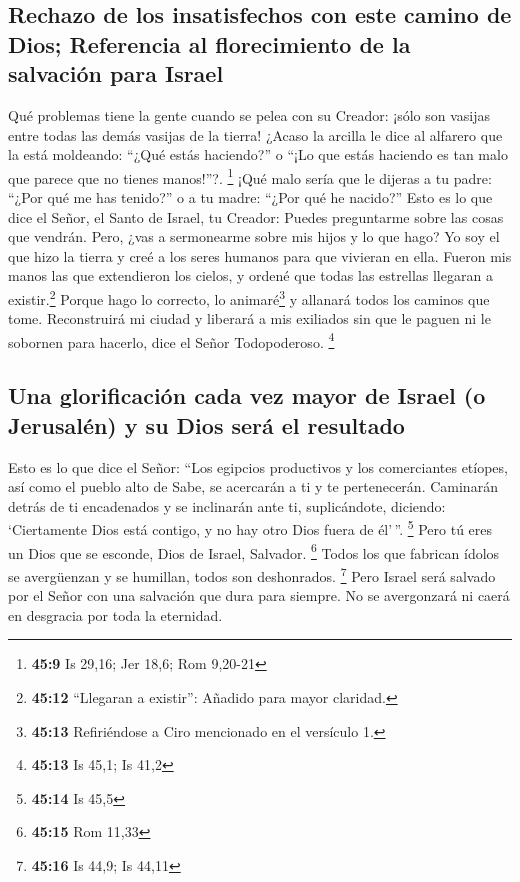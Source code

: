 \hypertarget{rechazo-de-los-insatisfechos-con-este-camino-de-dios-referencia-al-florecimiento-de-la-salvaciuxf3n-para-israel}{%
\subsection{Rechazo de los insatisfechos con este camino de Dios;
Referencia al florecimiento de la salvación para
Israel}\label{rechazo-de-los-insatisfechos-con-este-camino-de-dios-referencia-al-florecimiento-de-la-salvaciuxf3n-para-israel}}

 Qué problemas tiene la gente cuando se pelea con su
Creador: ¡sólo son vasijas entre todas las demás vasijas de la tierra!
¿Acaso la arcilla le dice al alfarero que la está moldeando: ``¿Qué
estás haciendo?'' o ``¡Lo que estás haciendo es tan malo que parece que
no tienes manos!''?. \footnote{\textbf{45:9} Is 29,16; Jer 18,6; Rom
  9,20-21}  ¡Qué malo sería que le dijeras a tu padre:
``¿Por qué me has tenido?'' o a tu madre: ``¿Por qué he nacido?''
 Esto es lo que dice el Señor, el Santo de Israel, tu
Creador: Puedes preguntarme sobre las cosas que vendrán. Pero, ¿vas a
sermonearme sobre mis hijos y lo que hago?  Yo soy el que
hizo la tierra y creé a los seres humanos para que vivieran en ella.
Fueron mis manos las que extendieron los cielos, y ordené que todas las
estrellas llegaran a existir.\footnote{\textbf{45:12} ``Llegaran a
  existir'': Añadido para mayor claridad.}  Porque hago
lo correcto, lo animaré\footnote{\textbf{45:13} Refiriéndose a Ciro
  mencionado en el versículo 1.} y allanará todos los caminos que tome.
Reconstruirá mi ciudad y liberará a mis exiliados sin que le paguen ni
le sobornen para hacerlo, dice el Señor Todopoderoso. \footnote{\textbf{45:13}
  Is 45,1; Is 41,2}

\hypertarget{una-glorificaciuxf3n-cada-vez-mayor-de-israel-o-jerusaluxe9n-y-su-dios-seruxe1-el-resultado}{%
\subsection{Una glorificación cada vez mayor de Israel (o Jerusalén) y
su Dios será el
resultado}\label{una-glorificaciuxf3n-cada-vez-mayor-de-israel-o-jerusaluxe9n-y-su-dios-seruxe1-el-resultado}}

 Esto es lo que dice el Señor: ``Los egipcios productivos
y los comerciantes etíopes, así como el pueblo alto de Sabe, se
acercarán a ti y te pertenecerán. Caminarán detrás de ti encadenados y
se inclinarán ante ti, suplicándote, diciendo: `Ciertamente Dios está
contigo, y no hay otro Dios fuera de él'\,''. \footnote{\textbf{45:14}
  Is 45,5}  Pero tú eres un Dios que se esconde, Dios de
Israel, Salvador. \footnote{\textbf{45:15} Rom 11,33} 
Todos los que fabrican ídolos se avergüenzan y se humillan, todos son
deshonrados. \footnote{\textbf{45:16} Is 44,9; Is 44,11} 
Pero Israel será salvado por el Señor con una salvación que dura para
siempre. No se avergonzará ni caerá en desgracia por toda la eternidad.

